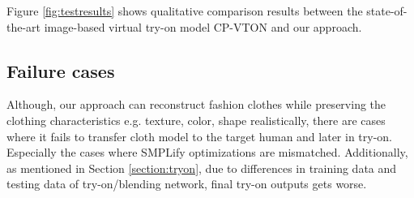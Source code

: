 Figure \ref{fig:testresults} shows qualitative comparison results between the state-of-the-art image-based virtual try-on model CP-VTON\cite{Wang2018TowardCI} and our approach.



\subsection{Failure cases}

Although, our approach can reconstruct fashion clothes while preserving the clothing characteristics e.g. texture, color, shape realistically, there are cases where it fails to transfer cloth model to the target human and later in try-on. Especially the cases where SMPLify\cite{Bogo2016SMPLify} optimizations are mismatched. Additionally, as mentioned in Section \ref{section:tryon}, due to differences in training data and testing data of try-on/blending network, final try-on outputs gets worse.



